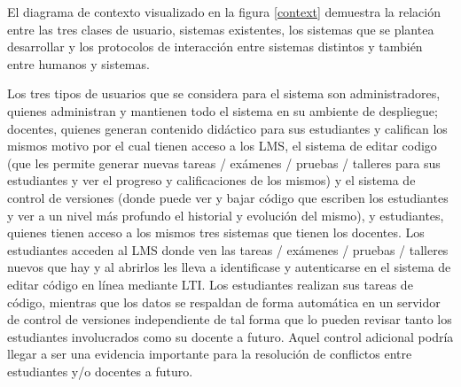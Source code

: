 El diagrama de contexto visualizado en la figura \ref{context} demuestra la relación entre las tres clases de usuario, sistemas existentes, los sistemas que se plantea desarrollar y los protocolos de interacción entre sistemas distintos y también entre humanos y sistemas.

      
Los tres tipos de usuarios que se considera para el sistema son administradores, quienes administran y mantienen todo el sistema en su ambiente de despliegue; docentes, quienes generan contenido didáctico para sus estudiantes y califican los mismos motivo por el cual tienen acceso a los LMS, el sistema de editar codigo (que les permite generar nuevas tareas / exámenes / pruebas / talleres para sus estudiantes y ver el progreso y calificaciones de los mismos) y el sistema de control de versiones (donde puede ver y bajar código que escriben los estudiantes y ver a un nivel más profundo el historial y evolución del mismo), y estudiantes, quienes tienen acceso a los mismos tres sistemas que tienen los docentes. Los estudiantes acceden al LMS  donde ven las tareas / exámenes / pruebas / talleres nuevos que hay y al abrirlos les lleva a identificase y autenticarse en el sistema de editar código en línea mediante LTI. Los estudiantes realizan sus tareas de código, mientras que los datos se respaldan de forma automática en un servidor de control de versiones independiente de tal forma que lo pueden revisar tanto los estudiantes involucrados como su docente a futuro. Aquel control adicional podría llegar a ser una evidencia importante para la resolución de conflictos entre estudiantes y/o docentes a futuro.

